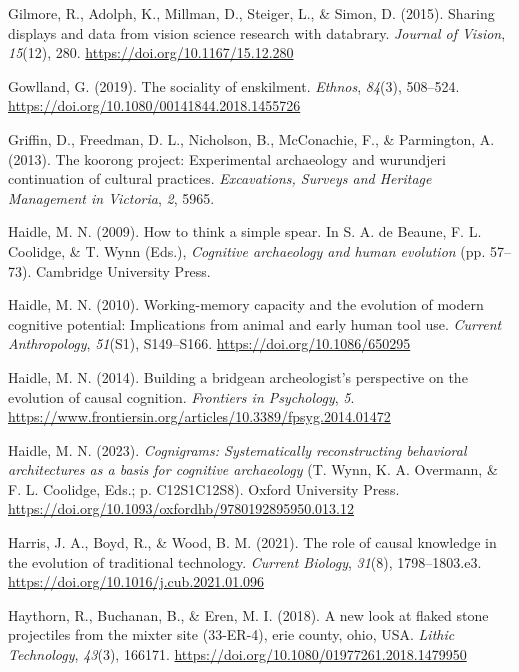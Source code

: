 \documentclass[
  11pt,
  letterpaper,
  DIV=11,
  numbers=noendperiod]{scrartcl}
\newlength{\cslhangindent}
\newenvironment{CSLReferences}[2] %
 {\begin{list}{}{%
  \setlength{\itemindent}{0pt}
  \setlength{\leftmargin}{0pt}
  \setlength{\parsep}{0pt}
  \ifodd #1
   \setlength{\leftmargin}{\cslhangindent}
   \setlength{\itemindent}{-1\cslhangindent}
  \fi
  \setlength{\itemsep}{#2\baselineskip}}}
 {\end{list}}
\begin{document}
\begin{CSLReferences}{1}{0}
Gilmore, R., Adolph, K., Millman, D., Steiger, L., \& Simon, D. (2015).
Sharing displays and data from vision science research with databrary.
\emph{Journal of Vision}, \emph{15}(12), 280.
\url{https://doi.org/10.1167/15.12.280}

Gowlland, G. (2019). The sociality of enskilment. \emph{Ethnos},
\emph{84}(3), 508--524.
\url{https://doi.org/10.1080/00141844.2018.1455726}

Griffin, D., Freedman, D. L., Nicholson, B., McConachie, F., \&
Parmington, A. (2013). The koorong project: Experimental archaeology and
wurundjeri continuation of cultural practices. \emph{Excavations,
Surveys and Heritage Management in Victoria}, \emph{2}, 5965.

Haidle, M. N. (2009). How to think a simple spear. In S. A. de Beaune,
F. L. Coolidge, \& T. Wynn (Eds.), \emph{Cognitive archaeology and human
evolution} (pp. 57--73). Cambridge University Press.

Haidle, M. N. (2010). Working-memory capacity and the evolution of
modern cognitive potential: Implications from animal and early human
tool use. \emph{Current Anthropology}, \emph{51}(S1), S149--S166.
\url{https://doi.org/10.1086/650295}

Haidle, M. N. (2014). Building a bridge{\textemdash}an archeologist's
perspective on the evolution of causal cognition. \emph{Frontiers in
Psychology}, \emph{5}.
\url{https://www.frontiersin.org/articles/10.3389/fpsyg.2014.01472}

Haidle, M. N. (2023). \emph{Cognigrams: Systematically reconstructing
behavioral architectures as a basis for cognitive archaeology} (T. Wynn,
K. A. Overmann, \& F. L. Coolidge, Eds.; p. C12S1C12S8). Oxford
University Press.
\url{https://doi.org/10.1093/oxfordhb/9780192895950.013.12}

Harris, J. A., Boyd, R., \& Wood, B. M. (2021). The role of causal
knowledge in the evolution of traditional technology. \emph{Current
Biology}, \emph{31}(8), 1798--1803.e3.
\url{https://doi.org/10.1016/j.cub.2021.01.096}

Haythorn, R., Buchanan, B., \& Eren, M. I. (2018). A new look at flaked
stone projectiles from the mixter site (33-ER-4), erie county, ohio,
USA. \emph{Lithic Technology}, \emph{43}(3), 166171.
\url{https://doi.org/10.1080/01977261.2018.1479950}


\end{CSLReferences}
\end{document}
